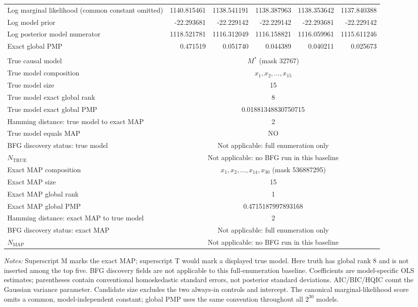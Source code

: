 \begin{longtable}{lrrrrr}
Log marginal likelihood (common constant omitted) & 1140.815461 & 1138.541191 & 1138.387963 & 1138.353642 & 1137.840388 \\
Log model prior & -22.293681 & -22.229142 & -22.229142 & -22.293681 & -22.229142 \\
Log posterior model numerator & 1118.521781 & 1116.312049 & 1116.158821 & 1116.059961 & 1115.611246 \\
Exact global PMP & 0.471519 & 0.051740 & 0.044389 & 0.040211 & 0.025673 \\
\pagebreak
\midrule
\multicolumn{6}{l}{\textit{Synthetic benchmark reference}} \\
True causal model & \multicolumn{5}{c}{$M^*$ (mask 32767)} \\
True model composition & \multicolumn{5}{c}{$x_1,x_2,\ldots,x_{15}$} \\
True model size & \multicolumn{5}{c}{15} \\
True model exact global rank & \multicolumn{5}{c}{8} \\
True model exact global PMP & \multicolumn{5}{c}{0.01881348830750715} \\
Hamming distance: true model to exact MAP & \multicolumn{5}{c}{2} \\
True model equals MAP & \multicolumn{5}{c}{NO} \\
BFG discovery status: true model & \multicolumn{5}{c}{Not applicable: full enumeration only} \\
$N_{\mathrm{TRUE}}$ & \multicolumn{5}{c}{Not applicable: no BFG run in this baseline} \\
Exact MAP composition & \multicolumn{5}{c}{$x_1,x_2,\ldots,x_{14},x_{30}$ (mask 536887295)} \\
Exact MAP size & \multicolumn{5}{c}{15} \\
Exact MAP global rank & \multicolumn{5}{c}{1} \\
Exact MAP global PMP & \multicolumn{5}{c}{0.4715187997893168} \\
Hamming distance: exact MAP to true model & \multicolumn{5}{c}{2} \\
BFG discovery status: exact MAP & \multicolumn{5}{c}{Not applicable: full enumeration only} \\
$N_{\mathrm{MAP}}$ & \multicolumn{5}{c}{Not applicable: no BFG run in this baseline} \\
\end{longtable}
\par\smallskip
\noindent\begin{minipage}{0.97\textwidth}\scriptsize
\textit{Notes:} Superscript M marks the exact MAP; superscript T would mark a displayed true model. Here truth has global rank 8 and is not inserted among the top five. BFG discovery fields are not applicable to this full-enumeration baseline. 
Coefficients are model-specific OLS estimates; parentheses contain conventional homoskedastic standard errors, not posterior standard deviations. 
AIC/BIC/HQIC count the Gaussian variance parameter. Candidate size excludes the two always-in controls and intercept. 
The canonical marginal-likelihood score omits a common, model-independent constant; global PMP uses the same convention throughout all $2^{30}$ models.
\end{minipage}
\endgroup